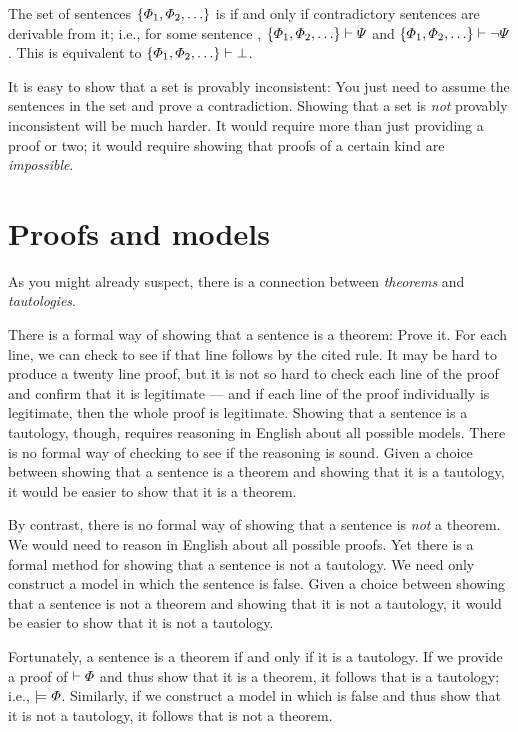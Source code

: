 The set of sentences $\{\varPhi{}_1,\varPhi{}_2,\ldots\}$ is  if and only if contradictory sentences are derivable from it; i.e., for some sentence \metaB{}, $\{\varPhi{}_1,\varPhi{}_2,\ldots\}\vdash\varPsi{}$ and $\{\varPhi{}_1,\varPhi{}_2,\ldots\}\vdash\neg \varPsi{}$. This is equivalent to $\{\varPhi{}_1,\varPhi{}_2,\ldots\}\vdash\bot$.

It is easy to show that a set is provably inconsistent: You just need to assume the sentences in the set and prove a contradiction. Showing that a set is \emph{not} provably inconsistent will be much harder. It would require more than just providing a proof or two; it would require showing that proofs of a certain kind are \emph{impossible}.


\section{Proofs and models}
As you might already suspect, there is a connection between \emph{theorems} and \emph{tautologies}.

There is a formal way of showing that a sentence is a theorem: Prove it. For each line, we can check to see if that line follows by the cited rule. It may be hard to produce a twenty line proof, but it is not so hard to check each line of the proof and confirm that it is legitimate --- and if each line of the proof individually is legitimate, then the whole proof is legitimate. Showing that a sentence is a tautology, though, requires reasoning in English about all possible models. There is no formal way of checking to see if the reasoning is sound. Given a choice between showing that a sentence is a theorem and showing that it is a tautology, it would be easier to show that it is a theorem.

By contrast, there is no formal way of showing that a sentence is \emph{not} a theorem. We would need to reason in English about all possible proofs. Yet there is a formal method for showing that a sentence is not a tautology. We need only construct a model in which the sentence is false. Given a choice between showing that a sentence is not a theorem and showing that it is not a tautology, it would be easier to show that it is not a tautology.

Fortunately, a sentence is a theorem if and only if it is a tautology. If we provide a proof of $\vdash\varPhi{}$ and thus show that it is a theorem, it follows that \metaA{} is a tautology; i.e., $\models\varPhi{}$. Similarly, if we construct a model in which \metaA{} is false and thus show that it is not a tautology, it follows that \metaA{} is not a theorem.

